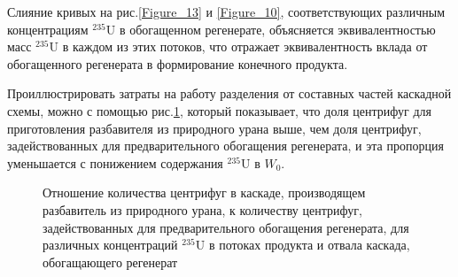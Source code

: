Слияние кривых на рис.\ref{Figure_13} и \ref{Figure_10}, соответствующих различным концентрациям $^{235}$U в обогащенном регенерате, объясняется эквивалентностью масс $^{235}$U в каждом из этих потоков, что отражает эквивалентность вклада от обогащенного регенерата в формирование конечного продукта.

Проиллюстрировать затраты на работу разделения от составных  частей каскадной схемы, можно с помощью рис.\ref{myplot}, который показывает, что доля центрифуг для приготовления разбавителя из природного урана выше, чем доля центрифуг, задействованных для предварительного обогащения регенерата, и эта пропорция уменьшается с понижением содержания $^{235}$U в $W_0$.

\begin{figure}[ht]
  \caption{Отношение количества центрифуг в каскаде, производящем разбавитель из природного урана, к количеству центрифуг, задействованных для предварительного обогащения регенерата, для различных концентраций $^{235}$U в потоках продукта и отвала каскада, обогащающего регенерат}\label{myplot}
\end{figure}


